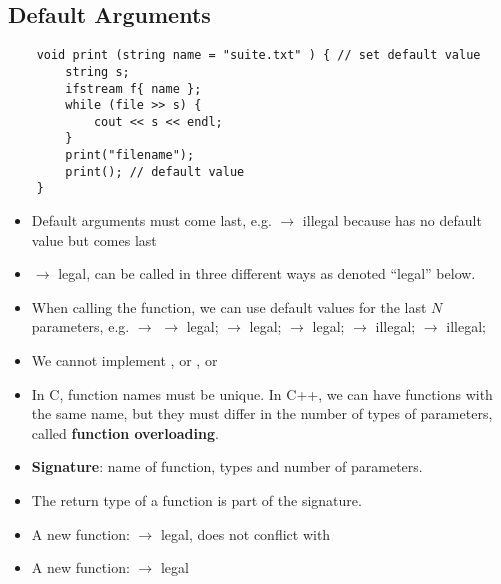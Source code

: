 \subsection{Default Arguments}
\begin{lstlisting}
    void print (string name = "suite.txt" ) { // set default value
        string s;
        ifstream f{ name };
        while (file >> s) {
            cout << s << endl;
        }
        print("filename");
        print(); // default value
    }
\end{lstlisting}
\begin{itemize}
    \item Default arguments must come last, e.g. 
    $ \rightarrow $  illegal because  has no default value but comes last
    \item {} $ \rightarrow $ legal,
    can be called in three different ways as denoted ``legal'' below.
    \item When calling the function, we can use default values for the last
    $ N $ parameters, e.g. $ \rightarrow $ 
    \subitem {} $ \rightarrow $ legal;
    \subitem {} $ \rightarrow $ legal;
    \subitem {} $ \rightarrow $ legal;
    \subitem {} $ \rightarrow $ illegal;
    \subitem {} $ \rightarrow $ illegal;
    \item We cannot implement , or , or
    \item In C, function names must be unique. In C++, we can have functions with
    the same name, but they must differ in the number of types of parameters,
    called \textbf{function overloading}. 
    \item \textbf{Signature}: name of function, types and number of parameters.
    \item The return type of a function is  part of the signature.
    \item A new function:  $ \rightarrow $ legal,
    does not conflict with 
    \item A new function:  $ \rightarrow $ legal
\end{itemize}

